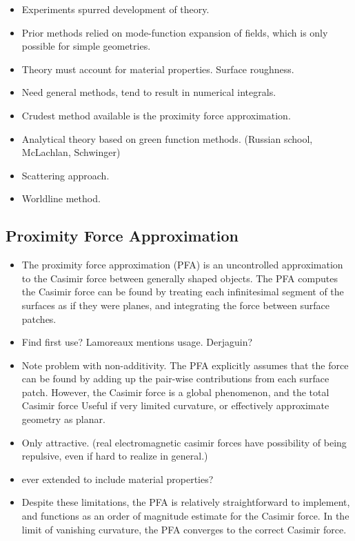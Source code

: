 \begin{itemize}
\item Experiments spurred development of theory.  
\item Prior methods relied on mode-function expansion of fields, which is only possible
for simple geometries.  
\item Theory must account for material properties.  Surface roughness.  
\item Need general methods, tend to result in numerical integrals.
\item Crudest method available is the proximity force approximation.  
\item Analytical theory based on green function methods.  (Russian school, McLachlan, Schwinger)
\item Scattering approach.  
\item Worldline method.  
\end{itemize}

\subsection{Proximity Force Approximation}

\begin{itemize}
\item The proximity force approximation (PFA) is an uncontrolled approximation to
the Casimir force between generally shaped objects.  
The PFA computes the Casimir force can be found by treating each infinitesimal segment
of the surfaces as if they were planes, and integrating the force between surface patches.
\item Find first use?  Lamoreaux mentions usage.  Derjaguin?\cite{Derjaguin1956}
\item Note problem with non-additivity. The PFA explicitly assumes that the force
can be found by adding up the pair-wise contributions from each surface patch.  
However, the Casimir force is a global phenomenon, and the total Casimir force
Useful if very limited curvature, or effectively approximate geometry as planar.  
\item Only attractive.  (real electromagnetic casimir forces have possibility of 
being repulsive, even if hard to realize in general.)
\item ever extended to include material properties?
\item Despite these limitations, the PFA is relatively straightforward to implement,
and functions as an order of magnitude estimate for the Casimir force.  In the limit
of vanishing curvature, the PFA converges to the correct Casimir force.  
\end{itemize}

